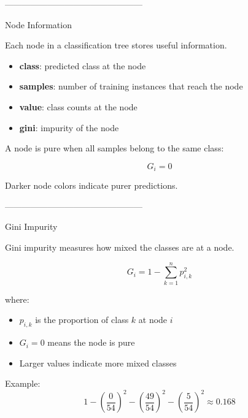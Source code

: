 \documentclass[aspectratio=169]{beamer}
\begin{document}
------------------------------------------------

\begin{frame}{Node Information}
	
	Each node in a classification tree stores useful information.
	
	\vspace{0.5em}
	
	\begin{itemize}
		\item \textbf{class}: predicted class at the node
		\item \textbf{samples}: number of training instances that reach the node
		\item \textbf{value}: class counts at the node
		\item \textbf{gini}: impurity of the node
	\end{itemize}
	
	\vspace{0.75em}
	
	A node is pure when all samples belong to the same class:
	
	\[
	G_i = 0
	\]
	
	\vspace{0.5em}
	
	Darker node colors indicate purer predictions.
	
\end{frame}

------------------------------------------------

\begin{frame}{Gini Impurity}
	
	Gini impurity measures how mixed the classes are at a node.
	
	\[
	G_i
	=
	1 -
	\sum_{k=1}^{n}p_{i,k}^{2}
	\]
	
	\vspace{0.5em}
	
	where:
	
	\begin{itemize}
		\item $p_{i,k}$ is the proportion of class $k$ at node $i$
		\item $G_i=0$ means the node is pure
		\item Larger values indicate more mixed classes
	\end{itemize}
	
	\vspace{0.75em}
	
	Example:
	\[
	1-\left(\frac{0}{54}\right)^2
	-\left(\frac{49}{54}\right)^2
	-\left(\frac{5}{54}\right)^2
	\approx 0.168
	\]
	
\end{frame}
\end{document}
